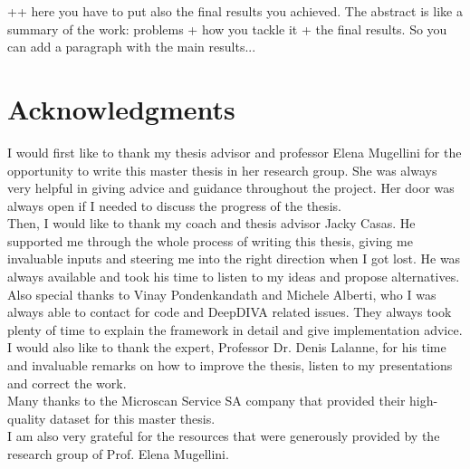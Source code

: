 \documentclass[11pt,a4paper,twoside,hidelinks,openright]{rvsmaster}
\begin{document}
\vspace{5mm} %

++  here you have to put also the final results you achieved. The abstract is like a summary of the work: problems + how you tackle it + the final results. So you can add a paragraph with the main results...


\tableofcontents{}
\listoffigures{}
\listoftables{}



\chapter*{Acknowledgments}

I would first like to thank my thesis advisor and professor Elena Mugellini for the opportunity to write this master thesis in her research group. She was always very helpful in giving advice and guidance throughout the project. Her door was always open if I needed to discuss the progress of the thesis.\\


Then, I would like to thank my coach and thesis advisor Jacky Casas. He supported me through the whole process of writing this thesis, giving me invaluable inputs and steering me into the right direction when I got lost. He was always available and took his time to listen to my ideas and propose alternatives.\\


Also special thanks to Vinay Pondenkandath and Michele Alberti, who I was always able to contact for code and DeepDIVA related issues. They always took plenty of time to explain the framework in detail and give implementation advice.\\


I would also like to thank the expert, Professor Dr. Denis Lalanne, for his time and invaluable remarks on how to improve the thesis, listen to my presentations and correct the work. \\


Many thanks to the Microscan Service SA company that provided their high-quality dataset for this master thesis.\\


I am also very grateful for the resources that were generously provided by the research group of Prof. Elena Mugellini.
\end{document}
